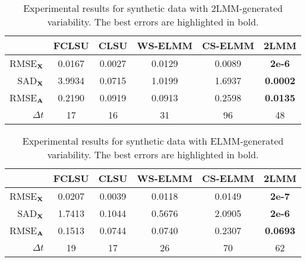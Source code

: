 \begin{table}[t]
    \caption{Experimental results for synthetic data with  2LMM-generated variability. The best errors are highlighted in bold.}
    \begin{center}
    \begin{tabular}{|r|ccccc|}
    \hline
               & FCLSU  & CLSU   & WS-ELMM & CS-ELMM & 2LMM  \\ \hline \hline
    RMSE$_{\mathbf{X}}$  & 0.0167 & 0.0027 & 0.0129  & 0.0089  & \textbf{2e-6}   \\ \hline
    SAD$_{\mathbf{X}}$   & 3.9934 & 0.0715 & 1.0199  & 1.6937  & \textbf{0.0002}   \\ \hline
    RMSE$_{\mathbf{A}}$  & 0.2190 & 0.0919 & 0.0913  & 0.2598  & \textbf{0.0135}    \\ \hline
    $\Delta t$ & 17     & 16     & 31      & 96      & 48                 \\ \hline
    \end{tabular}
    \end{center}
    \label{tab: results 2lmm lowvar}
\end{table}

\begin{table}[t]
    \caption{Experimental results for synthetic data with  ELMM-generated variability. The best errors are highlighted in bold.}
    \begin{center}
    \begin{tabular}{|r|ccccc|}
    \hline
               & FCLSU  & CLSU   & WS-ELMM & CS-ELMM & 2LMM   \\ \hline \hline
    RMSE$_{\mathbf{X}}$  & 0.0207 & 0.0039 & 0.0118  & 0.0149  & \textbf{2e-7}   \\ \hline
    SAD$_{\mathbf{X}}$   & 1.7413 & 0.1044 & 0.5676  & 2.0905  & \textbf{2e-6}    \\ \hline
    RMSE$_{\mathbf{A}}$  & 0.1513 & 0.0744 & 0.0740  & 0.2307  & \textbf{0.0693}    \\ \hline
    $\Delta t$ & 19     & 17     & 26      & 70      & 62                 \\ \hline
    \end{tabular}
    \end{center}
    \label{tab:results elmm lowvar}
\end{table}

